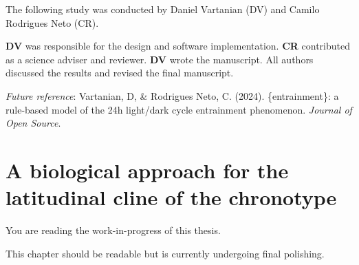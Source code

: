 \documentclass[
12pt,
openright,
oneside,
a4paper,
chapter=TITLE,
section=TITLE,
french,
spanish,
brazil,
english
]{abntex2}\usepackage{array}
\newcommand{\microskip}{\vspace{\microskipamount}}
\begin{document}
\begin{tcolorbox}[enhanced jigsaw, arc=.35mm, toprule=.15mm, opacitybacktitle=0.6, rightrule=.15mm, opacityback=0, colframe=quarto-callout-note-color-frame, titlerule=0mm, colback=white, toptitle=1mm, coltitle=black, left=2mm, colbacktitle=quarto-callout-note-color!10!white, title=\textcolor{quarto-callout-note-color}{\faInfo}\hspace{0.5em}{Note}, bottomrule=.15mm, breakable, bottomtitle=1mm, leftrule=.75mm]

The following study was conducted by Daniel Vartanian (DV) and Camilo
Rodrigues Neto (CR).

\microskip

\textbf{DV} was responsible for the design and software implementation.
\textbf{CR} contributed as a science adviser and reviewer. \textbf{DV}
wrote the manuscript. All authors discussed the results and revised the
final manuscript.

\microskip

\emph{Future reference}: Vartanian, D, \& Rodrigues Neto, C. (2024).
\{entrainment\}: a rule-based model of the 24h light/dark cycle
entrainment phenomenon. \emph{Journal of Open Source}.

\end{tcolorbox}


\chapter{A biological approach for the latitudinal cline of the
chronotype}\label{a-biological-approach-for-the-latitudinal-cline-of-the-chronotype}

\begin{tcolorbox}[enhanced jigsaw, arc=.35mm, toprule=.15mm, opacitybacktitle=0.6, rightrule=.15mm, opacityback=0, colframe=quarto-callout-note-color-frame, titlerule=0mm, colback=white, toptitle=1mm, coltitle=black, left=2mm, colbacktitle=quarto-callout-note-color!10!white, title=\textcolor{quarto-callout-note-color}{\faInfo}\hspace{0.5em}{Note}, bottomrule=.15mm, breakable, bottomtitle=1mm, leftrule=.75mm]

You are reading the work-in-progress of this thesis.

\microskip

This chapter should be readable but is currently undergoing final
polishing.

\end{tcolorbox}
\end{document}
